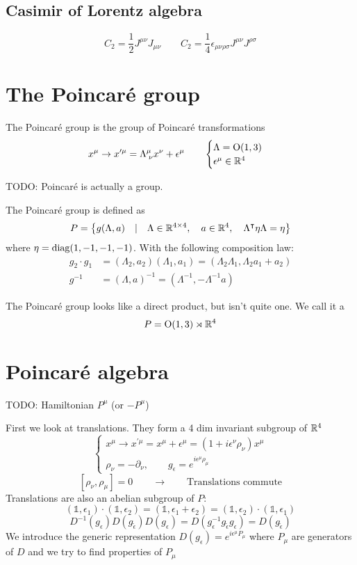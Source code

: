 \subsection{Casimir of Lorentz algebra}
\[ C_2 = \frac{1}{2}J^{\mu\nu}J_{\mu\nu} \qquad C_2 = \frac{1}{4}\epsilon_{\mu\nu\rho\sigma}J^{\mu\nu}J^{\rho\sigma} \]

\section{The Poincaré group}
The Poincaré group is the group of Poincaré transformations
\[ x^\mu \to x^{\prime\mu} = \Lambda^{\mu}_{\;\nu}x^\nu + \epsilon^\mu \qquad \begin{cases}
\Lambda = \operatorname{O}(1,3) \\
\epsilon^\mu \in \mathbb{R}^4
\end{cases} \]

TODO: Poincaré is actually a group.

\begin{definition}
The Poincaré group is defined as
\[P = \left\{g(\Lambda,a)\quad | \quad \Lambda\in\mathbb{R}^{4\times4},\quad a \in \mathbb{R}^4, \quad \Lambda^\intercal\eta\Lambda = \eta \right\}\]
where $\eta = \operatorname{diag}(1,-1,-1,-1)$. With the following composition law:
\begin{align*}
g_2\cdot g_1 &= (\Lambda_2, a_2)(\Lambda_1, a_1) = (\Lambda_2\Lambda_1, \Lambda_2a_1+a_2) \\
g^{-1} &= (\Lambda,a)^{-1} = (\Lambda^{-1}, -\Lambda^{-1}a)
\end{align*}
\end{definition}

The Poincaré group looks like a direct product, but isn't quite one. We call it a  
\[ P = \operatorname{O}(1,3)\rtimes \mathbb{R}^4 \]

\section{Poincaré algebra}
TODO: Hamiltonian $P^\mu$ (or $-P^\mu$) 

First we look at translations. They form a 4 dim invariant subgroup of $\mathbb{R}^4$
\[ \begin{cases}
x^\mu \to x^{\prime\mu} = x^\mu+\epsilon^\mu = \left(1+i\epsilon^\nu\rho_\nu\right)x^\mu \\
\rho_\nu = -\partial_\nu, \qquad g_\epsilon = e^{i\epsilon^\mu\rho_\mu}
\end{cases} \]
\[ \left[\rho_\nu,\rho_\mu\right] = 0 \qquad \to \qquad\text{Translations commute} \]
Translations are also an abelian subgroup of $P$:
\[ (\mathbb{1},\epsilon_1)\cdot(\mathbb{1},\epsilon_2) = (\mathbb{1},\epsilon_1+\epsilon_2) = (\mathbb{1},\epsilon_2)\cdot (\mathbb{1},\epsilon_1) \]
\[ D^{-1}(g_\epsilon)D(g_{\tilde{\epsilon}})D(g_\epsilon) = D(g^{-1}_\epsilon g_{\tilde{\epsilon}} g_\epsilon ) = D(g_{\tilde{\epsilon}}) \]
We introduce the generic representation $D(g_\epsilon) = e^{i\epsilon^\mu P_\mu}$ where $P_\mu$ are generators of $D$ and we try to find properties of $P_\mu$

